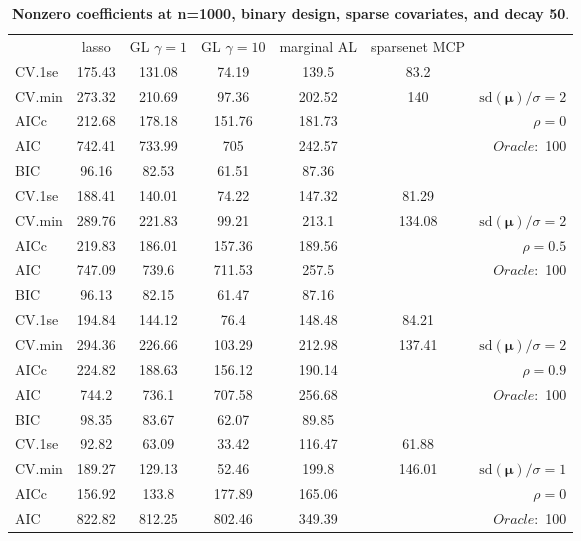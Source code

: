 \clearpage
\begin{table}\vspace{-.5cm}
\caption[l]{ { \bf Nonzero coefficients at n=1000, binary design, 
sparse covariates, and  decay  50}.}
\vspace{-.5cm}
\footnotesize{}
\begin{center}
\begin{tabular}{l*{5}{c}|r}
& lasso & GL $\gamma=1$ & GL $\gamma=10$ & marginal AL & sparsenet MCP  & \\
 \cline{1-7}
CV.1se & 175.43 & 131.08 & 74.19 & 139.5 & 83.2 & \\
CV.min & 273.32 & 210.69 & 97.36 & 202.52 & 140 &  $\mathrm{sd}(\mathbf{\mu})/\sigma=2$ \\
AICc & 212.68 & 178.18 & 151.76 & 181.73 & & $\rho=0$ \\
AIC & 742.41 & 733.99 & 705 & 242.57 & &  \multirow{2}{*}{$Oracle: $ 100} \\
BIC & 96.16 & 82.53 & 61.51 & 87.36 & &  \\
 \hline 
CV.1se & 188.41 & 140.01 & 74.22 & 147.32 & 81.29 & \\
CV.min & 289.76 & 221.83 & 99.21 & 213.1 & 134.08 &  $\mathrm{sd}(\mathbf{\mu})/\sigma=2$ \\
AICc & 219.83 & 186.01 & 157.36 & 189.56 & & $\rho=0.5$ \\
AIC & 747.09 & 739.6 & 711.53 & 257.5 & &  \multirow{2}{*}{$Oracle: $ 100} \\
BIC & 96.13 & 82.15 & 61.47 & 87.16 & &  \\
 \hline 
CV.1se & 194.84 & 144.12 & 76.4 & 148.48 & 84.21 & \\
CV.min & 294.36 & 226.66 & 103.29 & 212.98 & 137.41 &  $\mathrm{sd}(\mathbf{\mu})/\sigma=2$ \\
AICc & 224.82 & 188.63 & 156.12 & 190.14 & & $\rho=0.9$ \\
AIC & 744.2 & 736.1 & 707.58 & 256.68 & &  \multirow{2}{*}{$Oracle: $ 100} \\
BIC & 98.35 & 83.67 & 62.07 & 89.85 & &  \\
 \hline 
CV.1se & 92.82 & 63.09 & 33.42 & 116.47 & 61.88 & \\
CV.min & 189.27 & 129.13 & 52.46 & 199.8 & 146.01 &  $\mathrm{sd}(\mathbf{\mu})/\sigma=1$ \\
AICc & 156.92 & 133.8 & 177.89 & 165.06 & & $\rho=0$ \\
AIC & 822.82 & 812.25 & 802.46 & 349.39 & &  \multirow{2}{*}{$Oracle: $ 100} \\

\end{tabular}
\end{center}
\end{table}

